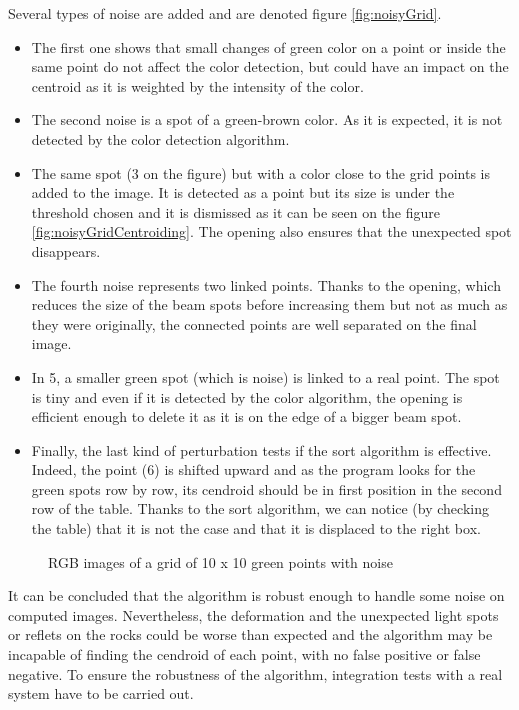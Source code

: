 Several types of noise are added and are denoted figure \ref{fig:noisyGrid}. 
\begin{itemize}
\item The first one shows that small changes of green color on a point or inside the same point do not affect the color detection, but could have an impact on the centroid as it is weighted by the intensity of the color. 
\item The second noise is a spot of a green-brown color. As it is expected, it is not detected by the color detection algorithm. 
\item The same spot (3 on the figure) but with a color close to the grid points is added to the image. It is detected as a point but its size is under the threshold chosen and it is dismissed as it can be seen on the figure \ref{fig:noisyGridCentroiding}. The opening also ensures that the unexpected spot disappears. 
\item The fourth noise represents two linked points. Thanks to the opening, which reduces the size of the beam spots before increasing them but not as much as they were originally, the connected points are well separated on the final image.
\item In 5, a smaller green spot (which is noise) is linked to a real point. The spot is tiny and even if it is detected by the color algorithm, the opening is efficient enough to delete it as it is on the edge of a bigger beam spot.
\item Finally, the last kind of perturbation tests if the sort algorithm is effective. Indeed, the point (6) is shifted upward and as the program looks for the green spots row by row, its cendroid should be in first position in the second row of the table. Thanks to the sort algorithm, we can notice (by checking the table) that it is not the case and that it is displaced to the right box. 
\end{itemize}

\begin{figure}[!h] 
\centering
{}
\quad 
{}
\caption{RGB images of a grid of 10 x 10 green points with noise} 
\end{figure}

It can be concluded that the algorithm is robust enough to handle some noise on computed images. Nevertheless, the deformation and the unexpected light spots or reflets on the rocks could be worse than expected and the algorithm may be incapable of finding the cendroid of each point, with no false positive or false negative. To ensure the robustness of the algorithm, integration tests with a real system have to be carried out.